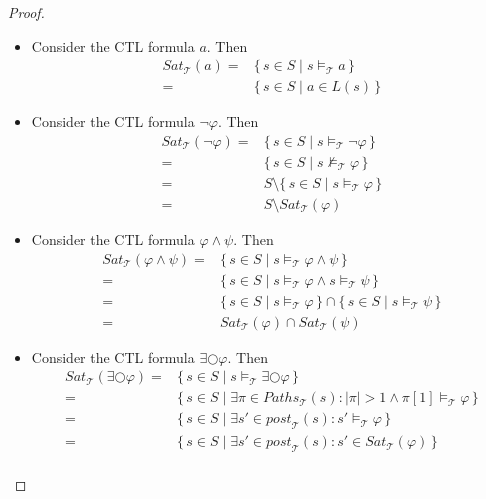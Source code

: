 \documentclass[12pt]{article}
\newcommand{\nxt}{\bigcirc}
\theoremstyle{definition}
\begin{document}
\begin{proof}\ 
\begin{itemize}
\item
Consider the CTL formula $a$.  Then
\begin{align*}
\mathit{Sat}_{\mathcal{T}}(a)
= & \{\, s \in S \mid s \models_{\mathcal{T}} a \,\}\\
= & \{\, s \in S \mid a \in L(s) \,\}
\end{align*}
\item
Consider the CTL formula $\neg \varphi$.  Then
\begin{align*}
\mathit{Sat}_{\mathcal{T}}(\neg \varphi)
= & \{\, s \in S \mid s \models_{\mathcal{T}} \neg \varphi \,\}\\
= & \{\, s \in S \mid s \not\models_{\mathcal{T}} \varphi \,\}\\
= & S \setminus \{\, s \in S \mid s \models_{\mathcal{T}} \varphi \,\}\\
= & S \setminus \mathit{Sat}_{\mathcal{T}}(\varphi)
\end{align*}
\item
Consider the CTL formula $\varphi \wedge \psi$.  Then
\begin{align*}
\mathit{Sat}_{\mathcal{T}}(\varphi \wedge \psi)
= & \{\, s \in S \mid s \models_{\mathcal{T}} \varphi \wedge \psi \,\}\\
= & \{\, s \in S \mid s \models_{\mathcal{T}} \varphi \wedge s \models_{\mathcal{T}} \psi \,\}\\
= & \{\, s \in S \mid s \models_{\mathcal{T}} \varphi \,\} \cap \{\, s \in S \mid s \models_{\mathcal{T}} \psi \,\}\\
= & \mathit{Sat}_{\mathcal{T}}(\varphi) \cap \mathit{Sat}_{\mathcal{T}}(\psi)
\end{align*}
\item
Consider the CTL formula $\exists \nxt \varphi$.  Then
\begin{align*}
\mathit{Sat}_{\mathcal{T}}(\exists \nxt \varphi)
= & \{\, s \in S \mid s \models_{\mathcal{T}} \exists \nxt \varphi \,\}\\
= & \{\, s \in S \mid \exists \pi \in \mathit{Paths}_{\mathcal{T}}(s) : |\pi| > 1 \wedge \pi[1] \models_{\mathcal{T}} \varphi \,\}\\
= & \{\, s \in S \mid \exists s' \in \mathit{post}_{\mathcal{T}}(s) : s' \models_{\mathcal{T}} \varphi \,\}\\
= & \{\, s \in S \mid \exists s' \in \mathit{post}_{\mathcal{T}}(s) : s' \in \mathit{Sat}_{\mathcal{T}}(\varphi) \,\}\\

\end{align*}
\end{itemize}
\end{proof}
\end{document}
